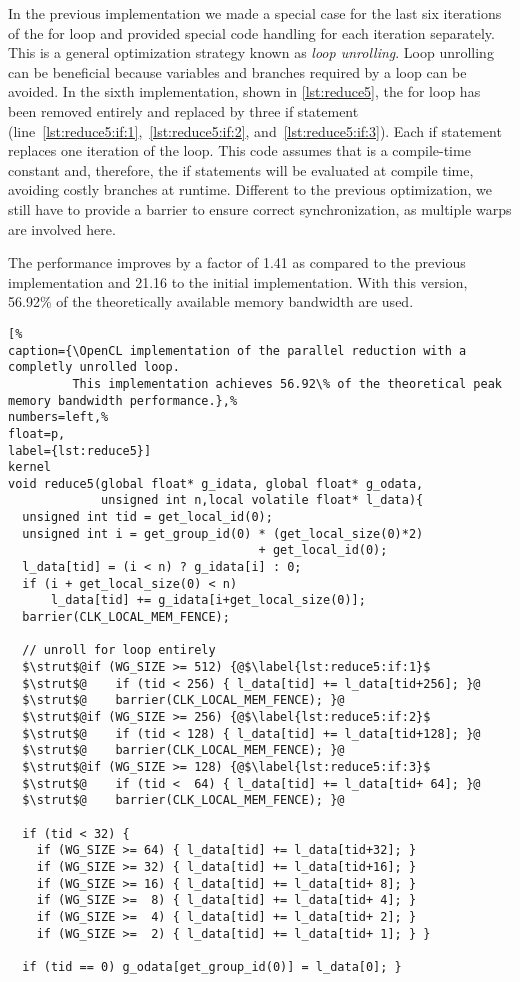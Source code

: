 In the previous implementation we made a special case for the last six iterations of the for loop and provided special code handling for each iteration separately.
This is a general optimization strategy known as \emph{loop unrolling}.
Loop unrolling can be beneficial because variables and branches required by a loop can be avoided.
In the sixth implementation, shown in \autoref{lst:reduce5}, the for loop has been removed entirely and replaced by three if statement (line~\ref{lst:reduce5:if:1},~\ref{lst:reduce5:if:2}, and~\ref{lst:reduce5:if:3}).
Each if statement replaces one iteration of the loop.
This code assumes that  is a compile-time constant and, therefore, the if statements will be evaluated at compile time, avoiding costly branches at runtime.
Different to the previous optimization, we still have to provide a barrier to ensure correct synchronization, as multiple warps are involved here.

The performance improves by a factor of 1.41 as compared to the previous implementation and 21.16 to the initial implementation.
With this version, 56.92\% of the theoretically available memory bandwidth are used.

\begin{lstlisting}[%                                                             
caption={\OpenCL implementation of the parallel reduction with a completly unrolled loop.
         This implementation achieves 56.92\% of the theoretical peak memory bandwidth performance.},%
numbers=left,%
float=p,
label={lst:reduce5}]
kernel
void reduce5(global float* g_idata, global float* g_odata,
             unsigned int n,local volatile float* l_data){
  unsigned int tid = get_local_id(0);
  unsigned int i = get_group_id(0) * (get_local_size(0)*2)
                                   + get_local_id(0);
  l_data[tid] = (i < n) ? g_idata[i] : 0;
  if (i + get_local_size(0) < n) 
      l_data[tid] += g_idata[i+get_local_size(0)];  
  barrier(CLK_LOCAL_MEM_FENCE);

  // unroll for loop entirely
  $\strut$@if (WG_SIZE >= 512) {@$\label{lst:reduce5:if:1}$
  $\strut$@    if (tid < 256) { l_data[tid] += l_data[tid+256]; }@
  $\strut$@    barrier(CLK_LOCAL_MEM_FENCE); }@
  $\strut$@if (WG_SIZE >= 256) {@$\label{lst:reduce5:if:2}$
  $\strut$@    if (tid < 128) { l_data[tid] += l_data[tid+128]; }@
  $\strut$@    barrier(CLK_LOCAL_MEM_FENCE); }@
  $\strut$@if (WG_SIZE >= 128) {@$\label{lst:reduce5:if:3}$
  $\strut$@    if (tid <  64) { l_data[tid] += l_data[tid+ 64]; }@
  $\strut$@    barrier(CLK_LOCAL_MEM_FENCE); }@
  
  if (tid < 32) {
    if (WG_SIZE >= 64) { l_data[tid] += l_data[tid+32]; }
    if (WG_SIZE >= 32) { l_data[tid] += l_data[tid+16]; }
    if (WG_SIZE >= 16) { l_data[tid] += l_data[tid+ 8]; }
    if (WG_SIZE >=  8) { l_data[tid] += l_data[tid+ 4]; }
    if (WG_SIZE >=  4) { l_data[tid] += l_data[tid+ 2]; }
    if (WG_SIZE >=  2) { l_data[tid] += l_data[tid+ 1]; } }
  
  if (tid == 0) g_odata[get_group_id(0)] = l_data[0]; }
\end{lstlisting}


